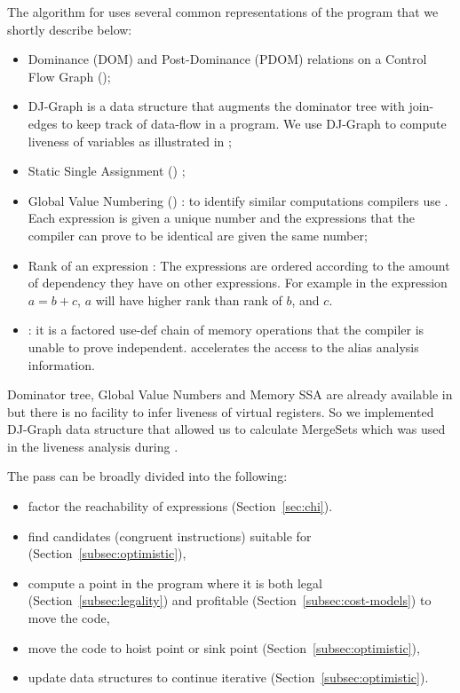 \documentclass[sigplan,10pt,review,anonymous]{acmart}\settopmatter{printfolios=true,printccs=false,printacmref=false}
\begin{document}
The algorithm for \GCM{} uses several common representations of the
program that we shortly describe below:
\begin{itemize}[leftmargin=*,topsep=0pt]
\item Dominance (DOM) and Post-Dominance (PDOM) relations \cite{dragonbook} on a
  Control Flow Graph (\CFG{});
\item DJ-Graph \cite{Sreedhar1996} is a data structure that augments the
  dominator tree with join-edges to keep track of data-flow in a program. We use
  DJ-Graph to compute liveness of variables as illustrated in \cite{das2012};
\item Static Single Assignment (\SSA{}) \cite{cytron};
\item Global Value Numbering (\GVN{}) \cite{rosen1988global,click1995global}: to
  identify similar computations compilers use \GVN{}.  Each expression is given
  a unique number and the expressions that the compiler can prove to be
  identical are given the same number;
\item Rank of an expression \cite{rosen1988global}: The expressions are ordered
  according to the amount of dependency they have on other expressions.  For
  example in the expression $a = b+c$, $a$ will have higher rank than rank of
  $b$, and $c$.
\item \MemorySSA{} \cite{novillo2007memory}: it is a factored use-def chain of
  memory operations that the compiler is unable to prove
  independent. \MemorySSA{} accelerates the access to the alias analysis
  information.
\end{itemize}

Dominator tree, Global Value Numbers and Memory SSA are already available in
\LLVM{} but there is no facility to infer liveness of virtual registers. So we
implemented DJ-Graph data structure that allowed us to calculate MergeSets which
was used in the liveness analysis during \GCM{}.

The \GCM{} pass can be broadly divided into the following:
\begin{itemize}[leftmargin=*,topsep=0pt]
\item factor the reachability of expressions (Section~\ref{sec:chi}).
\item find candidates (congruent instructions) suitable for \gcm{}
  (Section~\ref{subsec:optimistic}),
\item compute a point in the program where it is both legal
  (Section~\ref{subsec:legality}) and profitable
  (Section~\ref{subsec:cost-models}) to move the code,
\item move the code to hoist point or sink point
  (Section~\ref{subsec:optimistic}),
\item update data structures to continue iterative \gcm{} (Section~\ref{subsec:optimistic}).
\end{itemize}
\end{document}
